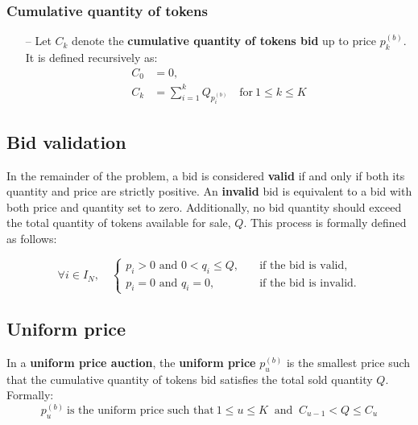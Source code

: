 \subsubsection*{Cumulative quantity of tokens}
\begin{itemize}
    \setlength\itemsep{0em}
    \item[--] Let $C_k$ denote the \textbf{cumulative quantity of tokens bid} up to price $p_k^{(b)}$. It is defined recursively as:
    \begin{equation*}
        \begin{split}
            C_0 &= 0, \\
            C_k &= \sum_{i = 1}^{k} Q_{p_i^{(b)}} \quad \text{for} \ 1 \leq k \leq K
        \end{split}
    \end{equation*}
\end{itemize}


\subsection{Bid validation}

In the remainder of the problem, a bid is considered \textbf{valid} if and only if both its quantity and price are strictly positive. An \textbf{invalid} bid is equivalent to a bid with both price and quantity set to zero. Additionally, no bid quantity should exceed the total quantity of tokens available for sale, $Q$. This process is formally defined as follows:

\begin{equation*}
    \forall i \in I_N, \quad 
\begin{cases}
p_i > 0 \text{ and } 0 < q_i \le Q, \quad &\text{if the bid is valid}, \\
p_i = 0 \text{ and } q_i = 0, \quad &\text{if the bid is invalid.}
\end{cases}
\end{equation*}

\subsection{Uniform price}
In a \textbf{uniform price auction}, the \textbf{uniform price} $p_u^{(b)}$ is the smallest price such that the cumulative quantity of tokens bid satisfies the total sold quantity $Q$. Formally:
\begin{equation*}
    p_{u}^{(b)} \ \text{is the uniform price such that} \ 1 \leq u \leq K \ \text{ and } \
C_{u-1} < Q \leq C_{u}
\end{equation*}

